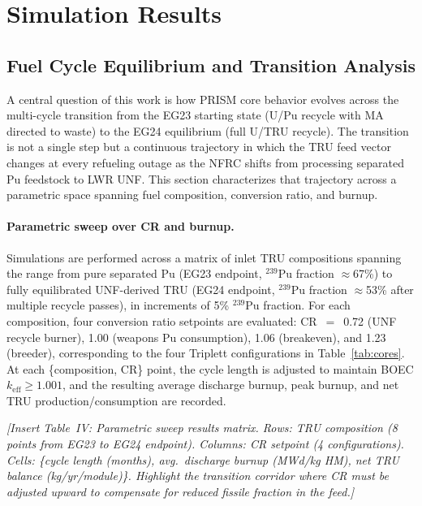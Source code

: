\documentclass[10pt,twoside]{article}
\newcommand{\placeholder}[1]{%
  \textcolor{placeholder}{\textit{[#1]}}}
\begin{document}
\section{Simulation Results}

\subsection{Fuel Cycle Equilibrium and Transition Analysis}
\label{sec:transition}

A central question of this work is how PRISM core behavior
evolves across the multi-cycle transition from the EG23 starting
state (U/Pu recycle with MA directed to waste) to the EG24
equilibrium (full U/TRU recycle).  The transition is not a
single step but a continuous trajectory in which the TRU feed
vector changes at every refueling outage as the NFRC shifts from
processing separated Pu feedstock to LWR UNF.  This section
characterizes that trajectory across a parametric space spanning
fuel composition, conversion ratio, and burnup.

\paragraph{Parametric sweep over CR and burnup.}
Simulations are performed across a matrix of inlet TRU compositions
spanning the range from pure separated Pu (EG23 endpoint,
$^{239}$Pu fraction $\approx$67\%) to fully equilibrated
UNF-derived TRU (EG24 endpoint, $^{239}$Pu fraction $\approx$53\%
after multiple recycle passes), in increments of 5\% $^{239}$Pu
fraction.  For each composition, four conversion ratio setpoints
are evaluated: CR~$=$~0.72 (UNF recycle burner), 1.00 (weapons Pu
consumption), 1.06 (breakeven), and 1.23 (breeder), corresponding
to the four Triplett configurations in Table~\ref{tab:cores}.
At each \{composition, CR\} point, the cycle length is adjusted
to maintain BOEC $k_\text{eff} \geq 1.001$, and the resulting
average discharge burnup, peak burnup, and net TRU
production/consumption are recorded.

\placeholder{Insert Table~IV: Parametric sweep results matrix.
  Rows: TRU composition (8 points from EG23 to EG24 endpoint).
  Columns: CR setpoint (4 configurations).
  Cells: \{cycle length (months), avg.\ discharge burnup
  (MWd/kg HM), net TRU balance (kg/yr/module)\}.
  Highlight the transition corridor where CR must be adjusted
  upward to compensate for reduced fissile fraction in the feed.}
\end{document}
